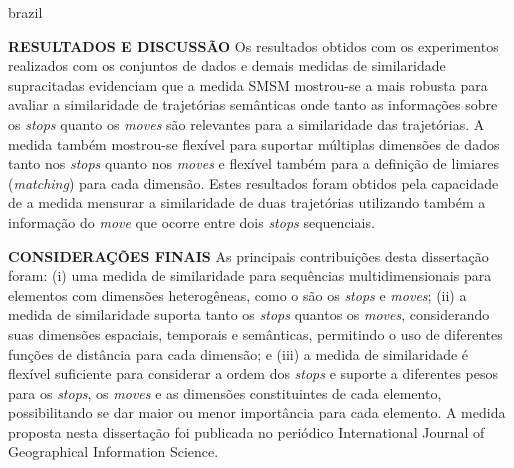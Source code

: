 {\begin{otherlanguage*}{brazil}
\begin{resumo}
        \textbf{RESULTADOS E DISCUSSÃO}
        \newline
        \newline
        Os resultados obtidos com os experimentos realizados com os conjuntos de dados e demais medidas de similaridade supracitadas evidenciam que a medida SMSM mostrou-se a mais robusta para avaliar a similaridade de trajetórias semânticas onde tanto as informações sobre os \emph{stops} quanto os \emph{moves} são relevantes para a similaridade das trajetórias. A medida também mostrou-se flexível para suportar múltiplas dimensões de dados tanto nos \emph{stops} quanto nos \emph{moves} e flexível também para a definição de limiares (\emph{matching}) para cada dimensão. Estes resultados foram obtidos pela capacidade de a medida mensurar a similaridade de duas trajetórias utilizando também a informação do \emph{move} que ocorre entre dois \emph{stops} sequenciais.
        
        \newline
        \newline
        \textbf{CONSIDERAÇÕES FINAIS}
        \newline
        \newline
        As principais contribuições desta dissertação foram: (i) uma medida de similaridade para sequências multidimensionais para elementos com dimensões heterogêneas, como o são os \emph{stops} e \emph{moves}; (ii) a medida de similaridade suporta tanto os \emph{stops} quantos os \emph{moves}, considerando suas dimensões espaciais, temporais e semânticas, permitindo o uso de diferentes funções de distância para cada dimensão; e (iii) a medida de similaridade é flexível suficiente para considerar a ordem dos \emph{stops} e suporte a diferentes pesos para os \emph{stops}, os \emph{moves} e as dimensões constituintes de cada elemento, possibilitando se dar maior ou menor importância para cada elemento. A medida proposta nesta dissertação foi publicada no periódico International Journal of Geographical Information Science.

    \end{resumo}
    \end{otherlanguage*}
}
